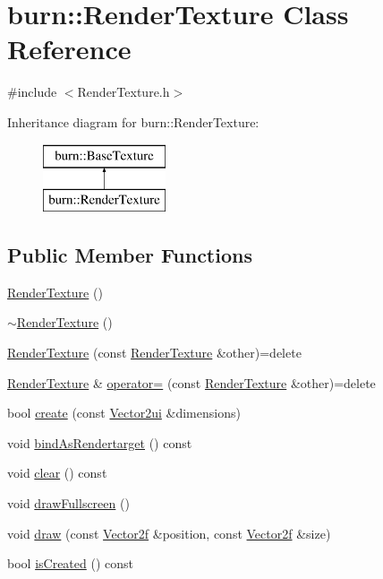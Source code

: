 \hypertarget{classburn_1_1_render_texture}{\section{burn\-:\-:Render\-Texture Class Reference}
\label{classburn_1_1_render_texture}
}


{\ttfamily \#include $<$Render\-Texture.\-h$>$}

Inheritance diagram for burn\-:\-:Render\-Texture\-:\begin{figure}[H]
\begin{center}
\leavevmode
\includegraphics[height=2.000000cm]{classburn_1_1_render_texture}
\end{center}
\end{figure}
\subsection*{Public Member Functions}
\begin{DoxyCompactItemize}
\item 
\hyperlink{classburn_1_1_render_texture_a45a90ff516418ff94aab80a662111bf2}{Render\-Texture} ()
\item 
\hyperlink{classburn_1_1_render_texture_aa4d4ccf9bc258394db5e3c9b17a8240a}{$\sim$\-Render\-Texture} ()
\item 
\hyperlink{classburn_1_1_render_texture_a88571931f632f9a48c2799158dda90c6}{Render\-Texture} (const \hyperlink{classburn_1_1_render_texture}{Render\-Texture} \&other)=delete
\item 
\hyperlink{classburn_1_1_render_texture}{Render\-Texture} \& \hyperlink{classburn_1_1_render_texture_acce2c388ed4850846da563480d2e549c}{operator=} (const \hyperlink{classburn_1_1_render_texture}{Render\-Texture} \&other)=delete
\item 
bool \hyperlink{classburn_1_1_render_texture_afb60cfbc42c0b3fc3543b3d2a954f7dd}{create} (const \hyperlink{namespaceburn_a6805fa33c49c4c3db88a7bebba2c408f}{Vector2ui} \&dimensions)
\item 
void \hyperlink{classburn_1_1_render_texture_a6eb29f7cb0cc790a23d222b6f44ddec1}{bind\-As\-Rendertarget} () const 
\item 
void \hyperlink{classburn_1_1_render_texture_a3316518369cf057633d22d06a6b1b6bb}{clear} () const 
\item 
void \hyperlink{classburn_1_1_render_texture_a80874c4d209be8823dbf9a2e116e6192}{draw\-Fullscreen} ()
\item 
void \hyperlink{classburn_1_1_render_texture_a2f482e794c0c46f56ce89656afe7cefc}{draw} (const \hyperlink{namespaceburn_af5ed9eb70cbf0fb572098ff43e146a0a}{Vector2f} \&position, const \hyperlink{namespaceburn_af5ed9eb70cbf0fb572098ff43e146a0a}{Vector2f} \&size)
\item 
bool \hyperlink{classburn_1_1_render_texture_ac4f8310b46a88a371213f519eb48aa4f}{is\-Created} () const 
\end{DoxyCompactItemize}
